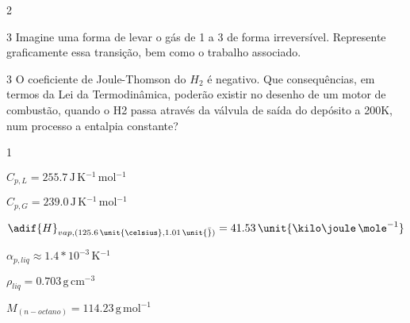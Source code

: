\documentclass[\mainfilename]{subfiles}
\begin{document}
\begin{questionBox}2{} %

    \begin{questionBox}3{ %
        Imagine uma forma de levar o gás de 1 a 3 de forma irreversível. Represente graficamente essa transição, bem como o trabalho associado.
    } %
    \end{questionBox}

    \begin{questionBox}3{ %
        O coeficiente de Joule-Thomson do \(H_2\) é negativo. Que consequências, em termos da  Lei da Termodinâmica, poderão existir no desenho de um motor de combustão, quando o H2 passa através da válvula de saída do depósito a 200K, num processo a entalpia constante?
    } %
    \end{questionBox}
\end{questionBox}


\begin{questionBox}1{} %
    \begin{itemize}
        \begin{multicols}{2}
            \item \(C_{p,L} = 255.7\,\unit{\joule\,\kelvin^{-1}\,\mole^{-1}}\)
            \item \(C_{p,G} = 239.0\,\unit{\joule\,\kelvin^{-1}\,\mole^{-1}}\)
            \item \(\adif{H}_{vap,(125.6\,\unit{\celsius}, 1.01\,\unit{\bar})} = 41.53\,\unit{\kilo\joule\,\mole^{-1}}\)
            \item \(\alpha_{p,liq} \approx 1.4*10^{-3}\,\unit{\kelvin^{-1}}\)
            \item \(\rho_{liq} = 0.703\,\unit{\gram\,\centi\metre^{-3}} \)
            \item \(M_{(n-octano)} = 114.23\,\unit{\gram\,\mole^{-1}}\)
        \end{multicols}
    \end{itemize}
\end{questionBox}
\end{document}
